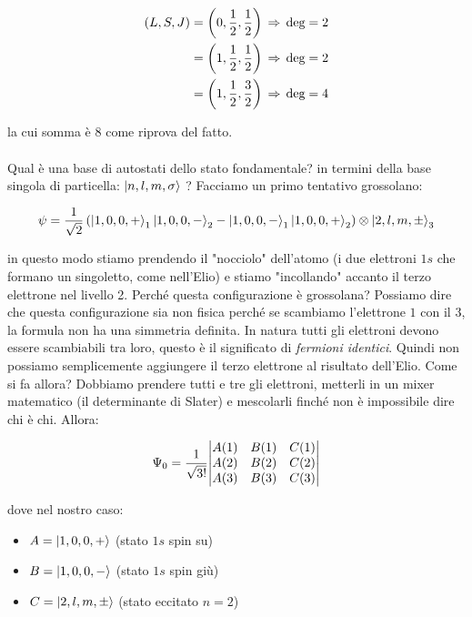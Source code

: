 \begin{itemize}
	\begin{align*}
		\qty(L, S, J) & = \qty(0, \frac{1}{2}, \frac{1}{2}) \, \Rightarrow \, \text{deg} = 2 \\
		& = \qty(1, \frac{1}{2}, \frac{1}{2}) \, \Rightarrow \, \text{deg} = 2 \\
		& = \qty(1, \frac{1}{2}, \frac{3}{2}) \, \Rightarrow \, \text{deg} = 4 
	\end{align*}
	
		la cui somma è $8$ come riprova del fatto.
		\\
		\\
		Qual è una base di autostati dello stato fondamentale? in termini della base singola di particella: $\ket{n, l, m, \sigma}$ ? Facciamo un primo tentativo grossolano:
		
	\begin{align*}
		\psi = \frac{1}{\sqrt{2}} \, \qty(\ket{1, 0, 0, +}_1 \ket{1, 0, 0, -}_2 - \ket{1, 0, 0, -}_1 \ket{1, 0, 0, +}_2 ) \otimes \ket{2, l, m, \pm}_3
	\end{align*}
	
		in questo modo stiamo prendendo il "nocciolo" dell'atomo (i due elettroni $1s$ che formano un singoletto, come nell'Elio) e stiamo "incollando" accanto il terzo elettrone nel livello 2. Perché questa configurazione è grossolana? Possiamo dire che questa configurazione sia non fisica perché se scambiamo l'elettrone $1$ con il $3$, la formula non ha una simmetria definita. In natura tutti gli elettroni devono essere scambiabili tra loro, questo è il significato di \textit{fermioni identici}. Quindi non possiamo semplicemente aggiungere il terzo elettrone al risultato dell'Elio. Come si fa allora? Dobbiamo prendere tutti e tre gli elettroni, metterli in un mixer matematico (il determinante di Slater) e mescolarli finché non è impossibile dire chi è chi. Allora:
		
	\begin{align*}
		\Psi_0 = \frac{1}{\sqrt{3!}} \mqty| A(1) & B(1) & C(1) \\  A(2) & B(2) & C(2) \\ A(3) & B(3) & C(3)   |
	\end{align*}
		
		dove nel nostro caso:
		
	\begin{itemize}
		\item $A = \ket{1, 0, 0, +}$ (stato $1s$ spin su)
		\item $B = \ket{1, 0, 0, -}$ (stato $1s$ spin giù)
		\item $C = \ket{2, l, m, \pm}$ (stato eccitato $n  =2$)
	\end{itemize}
	

\end{itemize}
